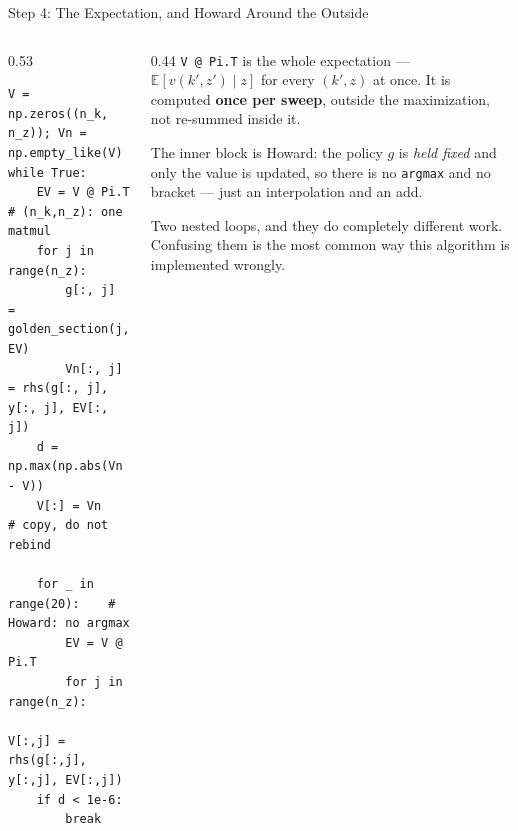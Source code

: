 \begin{frame}[fragile]{Step 4: The Expectation, and Howard Around the Outside}
\begin{columns}[T]
\begin{column}{0.53\textwidth}
\begin{lstlisting}
V = np.zeros((n_k, n_z)); Vn = np.empty_like(V)
while True:
    EV = V @ Pi.T          # (n_k,n_z): one matmul
    for j in range(n_z):
        g[:, j]  = golden_section(j, EV)
        Vn[:, j] = rhs(g[:, j], y[:, j], EV[:, j])
    d = np.max(np.abs(Vn - V))
    V[:] = Vn              # copy, do not rebind

    for _ in range(20):    # Howard: no argmax
        EV = V @ Pi.T
        for j in range(n_z):
            V[:,j] = rhs(g[:,j], y[:,j], EV[:,j])
    if d < 1e-6:
        break
\end{lstlisting}
\end{column}
\begin{column}{0.44\textwidth}
\small
\texttt{V @ Pi.T} is the whole expectation --- $\mathbb{E}[v(k',z')\mid z]$ for every $(k',z)$ at once. It is computed \textbf{once per sweep}, outside the maximization, not re-summed inside it.
\medskip
\begin{conceptbox}\footnotesize
The inner block is Howard: the policy $g$ is \emph{held fixed} and only the value is updated, so there is no \texttt{argmax} and no bracket --- just an interpolation and an add.
\end{conceptbox}
\medskip
\begin{examplebox}\footnotesize
Two nested loops, and they do completely different work. Confusing them is the most common way this algorithm is implemented wrongly.
\end{examplebox}
\end{column}
\end{columns}
\end{frame}

